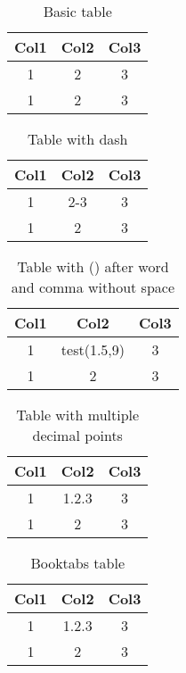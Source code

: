 \documentclass{article}
\begin{document}
\begin{table}[ht]
  \centering
  \caption{Basic table}
  \begin{tabular}{ccc}
    \hline
    Col1 & Col2 & Col3 \\
    \hline
    1 & 2 & 3 \\
    1 & 2 & 3 \\
    \hline
  \end{tabular}
\end{table}


\begin{table}[ht]
  \centering
  \caption{Table with dash}
  \begin{tabular}{ccc}
    \hline
    Col1 & Col2 & Col3 \\
    \hline
    1 & 2-3 & 3 \\
    1 & 2 & 3 \\
    \hline
  \end{tabular}
\end{table}


\begin{table}[ht]
  \centering
  \caption{Table with () after word and comma without space}
  \begin{tabular}{ccc}
    \hline
    Col1 & Col2 & Col3 \\
    \hline
    1 & test(1.5,9) & 3 \\
    1 & 2 & 3 \\
    \hline
  \end{tabular}
\end{table}

\begin{table}[ht]
  \centering
  \caption{Table with multiple decimal points}
  \begin{tabular}{ccc}
    \hline
    Col1 & Col2 & Col3 \\
    \hline
    1 & 1.2.3 & 3 \\
    1 & 2 & 3 \\
    \hline
  \end{tabular}
\end{table}

\begin{table}[ht]
  \centering
  \caption{Booktabs table}
  \begin{tabular}{ccc}
    \toprule
    Col1 & Col2 & Col3 \\
    \midrule
    1 & 1.2.3 & 3 \\
    1 & 2 & 3 \\
    \bottomrule
  \end{tabular}
\end{table}
\end{document}
